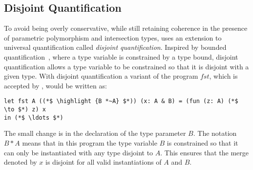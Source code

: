 %
%
%
%
%

\subsection{Disjoint Quantification}
To avoid being overly conservative, while still retaining coherence in the
presence of parametric polymorphism and intersection types, \namedis uses
an extension to universal quantification called \emph{disjoint quantification}.
Inspired by
bounded quantification~\cite{Cardelli:1994},
where a type variable is constrained by a type
bound, disjoint quantification allows a type variable to be
constrained so that it is disjoint with a
given type. With disjoint quantification a variant of the program $fst$, which
is accepted by \namedis, would be written as:
\begin{lstlisting}
let fst A ((*$ \highlight {B *~A} $*)) (x: A & B) = (fun (z: A) (*$ \to $*) z) x
in (*$ \ldots $*)
\end{lstlisting}
The small change is in the declaration of the type parameter $B$. The notation
$B*A$ means that in this program the type variable $B$ is constrained so that
it can only be instantiated with any type disjoint to $A$.
This ensures that the
merge denoted by $x$ is disjoint for all valid instantiations of $A$ and $B$.

